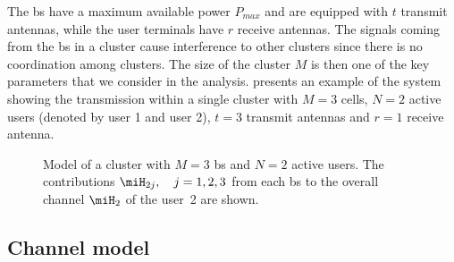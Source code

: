 The \gls{bs} have a maximum available power $P_{max}$ and are equipped with $t$ transmit antennas, while the user terminals
have $r$ receive antennas. The signals coming from the \gls{bs} in a cluster cause interference to other clusters since there is no
coordination among clusters. The size of the cluster $M$ is then one of the key parameters that we consider in the analysis.
 presents an example of the system showing the transmission within a single cluster with $M=3$ cells, $N=2$ active users (denoted by user 1 and user 2), $t=3$ transmit antennas and $r=1$ receive antenna.
\begin{figure}[h]
\begin{center}
\begin{small}
\end{small}
\end{center}
\vspace*{-2.0mm}\caption{Model of a cluster with $M=3$ \gls{bs} and $N=2$ active users. The contributions $\miH_{2j},\quad j=1,2,3$ from each \gls{bs} to the overall channel $\miH_{2}$ of the user~2 are shown.}\label{scheme}
\end{figure}

\subsection{Channel model}\label{channel_model}

